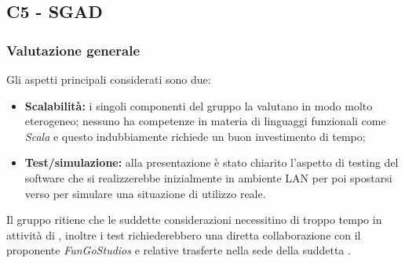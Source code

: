 \subsection{C5 - SGAD}
        \subsubsection{Valutazione generale}
        Gli aspetti principali considerati sono due:
        \begin{itemize}
            \item \textbf{Scalabilità:} i singoli componenti del gruppo la valutano in modo molto eterogeneo; nessuno ha competenze in materia di linguaggi funzionali come \emph{Scala} e questo indubbiamente richiede un buon investimento di tempo;
            \item \textbf{Test/simulazione:} alla presentazione è stato chiarito l'aspetto di testing del software che si realizzerebbe inizialmente in ambiente LAN per poi spostarsi verso  per simulare una situazione di utilizzo reale.
        \end{itemize}
        Il gruppo ritiene che le suddette considerazioni necessitino di troppo tempo in attività di , inoltre i test richiederebbero una diretta collaborazione con il proponente \textit{FunGoStudios} e relative trasferte nella sede della suddetta .
